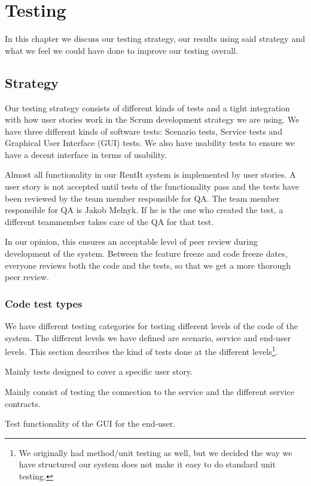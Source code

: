 \chapter{Testing}
\label{Testing}
In this chapter we discuss our testing strategy, our results using said strategy and what we feel we could have done to improve our testing overall.
\section{Strategy}
\label{Testing_Strategy}
Our testing strategy consists of different kinds of tests and a tight integration with how user stories work in the Scrum development strategy we are using. We have three different kinds of software tests: Scenario tests, Service tests and Graphical User Interface (GUI) tests. We also have usability tests to ensure we have a decent interface in terms of usability.

Almost all functionality in our RentIt system is implemented by user stories. A user story is not accepted until tests of the functionality pass and the tests have been reviewed by the team member responsible for QA. The team member responsible for QA is Jakob Melnyk. If he is the one who created the test, a different teammember takes care of the QA for that test.

In our opinion, this ensures an acceptable level of peer review during development of the system. Between the feature freeze and code freeze dates, everyone reviews both the code and the tests, so that we get a more thorough peer review.

\subsection{Code test types}
\label{Testing_Strategy_Types}
We have different testing categories for testing different levels of the code of the system. The different levels we have defined are scenario, service and end-user levels. This section describes the kind of tests done at the different levels\footnote{We originally had method/unit testing as well, but we decided the way we have structured our system does not make it easy to do standard unit testing.}.

\begin{my_description}
\item[Scenario-level] Mainly tests designed to cover a specific user story.
\item[Service-level] Mainly consist of testing the connection to the service and the different service contracts.
\item[End-User-level] Test functionality of the GUI for the end-user.
\end{my_description}

